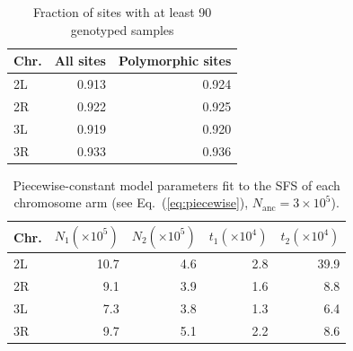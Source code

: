 \documentclass[11pt, letterpaper]{article}   	%
\newcommand{\eq}[1]{Eq.~(\ref{#1})}
\begin{document}
\begin{table}[h!]
  \begin{center}
    \caption{Fraction of sites with at least 90 genotyped samples}
    \label{tab:called_sites}
    \begin{tabular}{l|r|r} %
      \textbf{Chr.} & \textbf{All sites} & \textbf{Polymorphic sites}\\
      \hline
      2L & 0.913 & 0.924 \\
      2R & 0.922 & 0.925 \\
      3L & 0.919 & 0.920 \\
      3R & 0.933 & 0.936
    \end{tabular}
  \end{center}
\end{table}

\begin{table}[h!]
  \begin{center}
    \caption{Piecewise-constant model parameters fit to the SFS of each chromosome arm (see \eq{eq:piecewise}, $N_{\text{anc}}=3 \times 10^5$).}
    \label{tab:DPGP_params}
    \begin{tabular}{l|r|r|r|r} %
        \textbf{Chr.} & \textbf{$N_1 (\times 10^5)$} & \textbf{$N_2 (\times 10^5)$} & \textbf{$t_1 (\times 10^4)$} & \textbf{$t_2 (\times 10^4)$}\\
        \hline
        2L & 10.7 & 4.6 & 2.8 & 39.9 \\
        2R &  9.1 & 3.9 & 1.6 &  8.8 \\
        3L &  7.3 & 3.8 & 1.3 &  6.4 \\
        3R &  9.7 & 5.1 & 2.2 &  8.6
    \end{tabular}
  \end{center}
\end{table}
\end{document}
